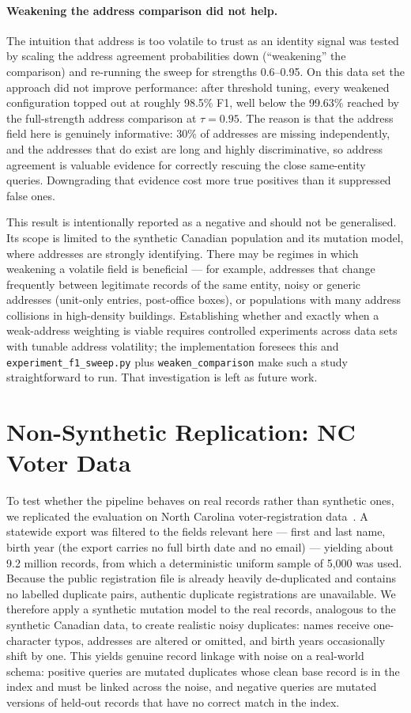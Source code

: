 \documentclass[conference]{IEEEtran}
\begin{document}
\paragraph{Weakening the address comparison did not help.}
The intuition that address is too volatile to trust as an identity signal was tested by scaling the address agreement probabilities down (``weakening'' the comparison) and re-running the sweep for strengths 0.6--0.95. On this data set the approach did not improve performance: after threshold tuning, every weakened configuration topped out at roughly 98.5\% F1, well below the 99.63\% reached by the full-strength address comparison at $\tau=0.95$. The reason is that the address field here is genuinely informative: 30\% of addresses are missing independently, and the addresses that do exist are long and highly discriminative, so address agreement is valuable evidence for correctly rescuing the close same-entity queries. Downgrading that evidence cost more true positives than it suppressed false ones.

This result is intentionally reported as a negative and should not be generalised. Its scope is limited to the synthetic Canadian population and its mutation model, where addresses are strongly identifying. There may be regimes in which weakening a volatile field is beneficial --- for example, addresses that change frequently between legitimate records of the same entity, noisy or generic addresses (unit-only entries, post-office boxes), or populations with many address collisions in high-density buildings. Establishing whether and exactly when a weak-address weighting is viable requires controlled experiments across data sets with tunable address volatility; the implementation foresees this and \texttt{experiment\_f1\_sweep.py} plus \texttt{weaken\_comparison} make such a study straightforward to run. That investigation is left as future work.


\section{Non-Synthetic Replication: NC Voter Data}
\label{sec:ncvoter-replication}
To test whether the pipeline behaves on real records rather than synthetic ones, we replicated the evaluation on North Carolina voter-registration data~\cite{ncvoter}. A statewide export was filtered to the fields relevant here --- first and last name, birth year (the export carries no full birth date and no email) --- yielding about 9.2 million records, from which a deterministic uniform sample of 5{,}000 was used. Because the public registration file is already heavily de-duplicated and contains no labelled duplicate pairs, authentic duplicate registrations are unavailable. We therefore apply a synthetic mutation model to the real records, analogous to the synthetic Canadian data, to create realistic noisy duplicates: names receive one-character typos, addresses are altered or omitted, and birth years occasionally shift by one. This yields genuine record linkage with noise on a real-world schema: positive queries are mutated duplicates whose clean base record is in the index and must be linked across the noise, and negative queries are mutated versions of held-out records that have no correct match in the index.
\end{document}
